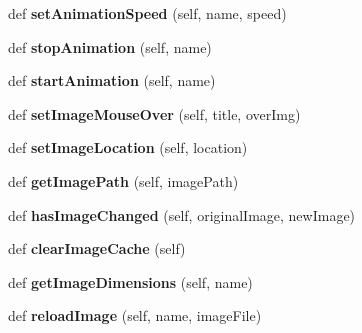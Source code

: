 \begin{DoxyCompactItemize}
def {\bfseries set\+Animation\+Speed} (self, name, speed)
\item 
\mbox{\label{class_python_01_g_u_i_1_1appjar_1_1gui_ae0ca73ff409080d35290152eb5017a86}} 
def {\bfseries stop\+Animation} (self, name)
\item 
\mbox{\label{class_python_01_g_u_i_1_1appjar_1_1gui_a32b567457bebf49bc444c1b1f29bf7dc}} 
def {\bfseries start\+Animation} (self, name)
\item 
\mbox{\label{class_python_01_g_u_i_1_1appjar_1_1gui_aca7c399ffd4017fa9984fb3d7b644531}} 
def {\bfseries set\+Image\+Mouse\+Over} (self, title, over\+Img)
\item 
\mbox{\label{class_python_01_g_u_i_1_1appjar_1_1gui_a625d2d9fe0f15dbab62008b94e0cedd9}} 
def {\bfseries set\+Image\+Location} (self, location)
\item 
\mbox{\label{class_python_01_g_u_i_1_1appjar_1_1gui_a6aa58c49d08b62a5fc934e3a8237fbe5}} 
def {\bfseries get\+Image\+Path} (self, image\+Path)
\item 
\mbox{\label{class_python_01_g_u_i_1_1appjar_1_1gui_a5f22b42fa5b634fb18acd44c9fd3bc29}} 
def {\bfseries has\+Image\+Changed} (self, original\+Image, new\+Image)
\item 
\mbox{\label{class_python_01_g_u_i_1_1appjar_1_1gui_a48103c2b1435c5c1f6c64f28fe958c9e}} 
def {\bfseries clear\+Image\+Cache} (self)
\item 
\mbox{\label{class_python_01_g_u_i_1_1appjar_1_1gui_ade2b66b2c103d819df72969ad7bb67d5}} 
def {\bfseries get\+Image\+Dimensions} (self, name)
\item 
\mbox{\label{class_python_01_g_u_i_1_1appjar_1_1gui_a2b38a904c8e7f9c229f59fc2bf2a4fe0}} 
def {\bfseries reload\+Image} (self, name, image\+File)
\item 
\mbox{\label{class_python_01_g_u_i_1_1appjar_1_1gui_aa04a866e7c7247efd52a6c808999bccb}} 

\end{DoxyCompactItemize}
